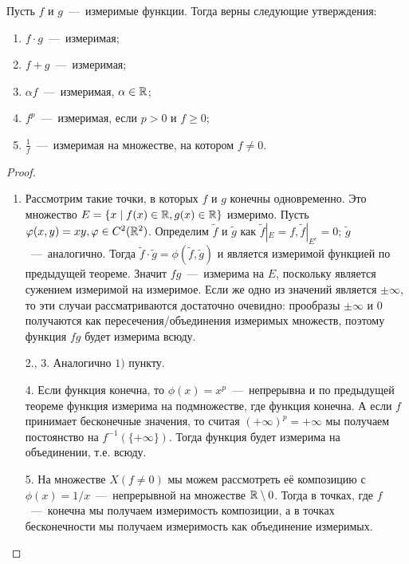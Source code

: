 \begin{theorem}
    Пусть $f$ и $g$~---~измеримые функции. Тогда верны следующие утверждения:
    \begin{enumerate}
        \item $f \cdot g$~---~измеримая;
        \item $f + g$~---~измеримая;
        \item $\alpha f$~---~измеримая, $\alpha \in \mathbb{R}$;
        \item $f^p$~---~измеримая, если $p > 0$ и $f \geq 0$;
        \item $\frac{1}{f}$~---~измеримая на множестве, на котором $f \neq 0$.
    \end{enumerate}
\end{theorem}
\begin{proof}
    \begin{enumerate}
        \item Рассмотрим такие точки, в которых $f$ и $g$ конечны одновременно. Это множество $E = \{x \mid f(x) \in \mathbb{R}, g(x) \in \mathbb{R}\}$ измеримо. Пусть $\varphi(x, y) = xy, \varphi \in C^2(\mathbb{R}^2)$. Определим $\tilde{f}$ и $\tilde{g}$ как $\tilde{f}|_E = f, \tilde{f}|_{E^c} = 0$; $\tilde{g}$~---~аналогично. Тогда $\tilde{f}\cdot\tilde{g} = \phi(\tilde{f}, \tilde{g})$ и является измеримой функцией по предыдущей теореме. Значит $fg$~---~измерима на $E$, поскольку является сужением измеримой на измеримое. Если же одно из значений является $\pm\infty$, то эти случаи рассматриваются достаточно очевидно: прообразы $\pm \infty$ и $0$ получаются как пересечения/объединения измеримых множеств, поэтому функция $fg$ будет измерима всюду.
        \item[2., 3.] Аналогично $1)$ пункту.
        \item[4.] Если функция конечна, то $\phi(x) = x^p$~---~непрерывна и по предыдущей теореме функция измерима на подмножестве, где функция конечна. А если $f$ принимает бесконечные значения, то считая $(+\infty)^p = +\infty$ мы получаем постоянство на $f^{-1}(\{+\infty\})$. Тогда функция будет измерима на объединении, т.е. всюду.
        \item[5.] На множестве $X(f \neq 0)$ мы можем рассмотреть её композицию с $\phi(x) = 1/x$~---~непрерывной на множестве $\mathbb{R} \setminus {0}$. Тогда в точках, где $f$~---~конечна мы получаем измеримость композиции, а в точках бесконечности мы получаем измеримость как объединение измеримых.
    \end{enumerate}
\end{proof}

